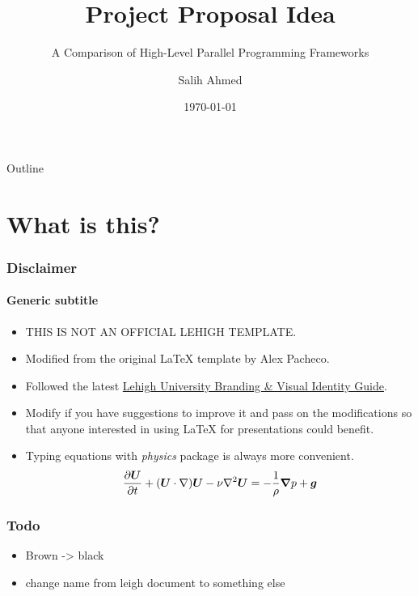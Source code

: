 \documentclass[11pt,t,aspectratio=169]{beamer} %
\title{Project Proposal Idea}
\subtitle{A Comparison of High-Level Parallel Programming Frameworks}
\author{Salih Ahmed}
\institute{University of Birmingham}
\date{\today}
\begin{document}
\begin{frame} %
    \titlepage
\end{frame}


\begin{frame}[c]{Outline} %
    \tableofcontents %
\end{frame}

\section{What is this?} %
    \begin{frame}[c]
        \frametitle{Disclaimer} %
        \framesubtitle{Generic subtitle} %
        \begin{multicols}{2}
        \begin{itemize}
            \item THIS IS NOT AN OFFICIAL LEHIGH TEMPLATE.
            \item Modified from the original \LaTeX{} template by Alex Pacheco.
            \item Followed the latest \href{https://www.lehigh.edu/~inis/sdownloads/Lehigh-Brand-Visual-Guide.pdf}{Lehigh University Branding \& Visual Identity Guide}.
            \item Modify if you have suggestions to improve it and pass on the modifications so that anyone interested in using \LaTeX{} for presentations could benefit.
            \end{itemize}
        \end{multicols}
        \begin{itemize}
            \item Typing equations with \emph{physics} package is always more convenient.
            $$\pdv{\vb*{U}}{t}+(\vb*{U}\cdot\nabla)\vb*{U}-\nu\laplacian\vb*{U} =-\frac{1}{\rho }\grad p+\vb*{g}$$
        \end{itemize}
    \end{frame}

    \begin{frame}[c]
        \frametitle{Todo} %
        \begin{itemize}
            \item Brown -> black
            \item change name from leigh document to something else
        \end{itemize}
    \end{frame}
\end{document}
